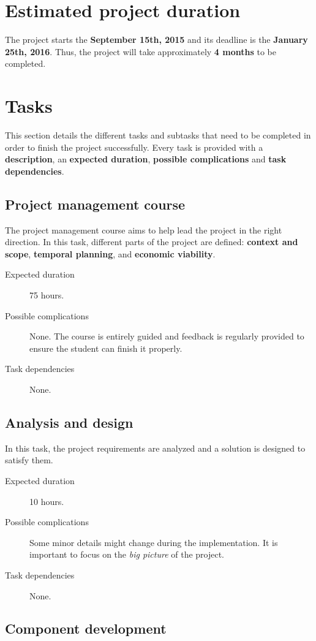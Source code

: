 \documentclass[a4paper,11pt,titlepage,abstract,numbers=noenddot,automark,mnsy,intlimits,rgb,dvipsnames]{report}
\begin{document}
\section{Estimated project duration}
The project starts the \textbf{September 15th, 2015} and its deadline is the \textbf{January 25th, 2016}. Thus,
the project will take approximately \textbf{4 months} to be completed.
\section{Tasks}
This section details the different tasks and subtasks that need to be completed in order
to finish the project successfully. Every task is provided with a \textbf{description}, an \textbf{expected duration},
\textbf{possible complications} and \textbf{task dependencies}.
\subsection{Project management course}
The project management course aims to help lead the project in the right direction. In this task,
different parts of the project are defined: \textbf{context and scope}, \textbf{temporal planning}, and
\textbf{economic viability}.
\begin{description}
\item[Expected duration]
75 hours.
\item[Possible complications]
None. The course is entirely guided and feedback is
  regularly provided to ensure the student can finish it properly.
\item[Task dependencies]
None.
\end{description}
\subsection{Analysis and design}
In this task, the project requirements are analyzed and a solution is designed to satisfy them.
\begin{description}
\item[Expected duration]
10 hours.
\item[Possible complications]
Some minor details might change during the implementation. It is
  important to focus on the \emph{big picture} of the project.
\item[Task dependencies]
None.
\end{description}
\subsection{Component development}
\end{document}
